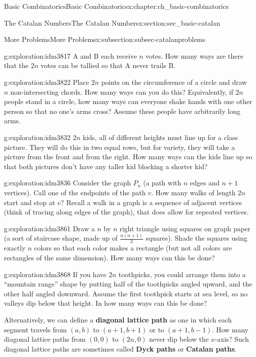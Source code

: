 \documentclass[oneside,10pt,]{book}
\newcommand{\terminology}[1]{\textbf{#1}}
\numberwithin{equation}{chapter}
\begin{document}
\begin{chapterptx}{Basic Combinatorics}{}{Basic Combinatorics}{}{}{x:chapter:ch_basic-combinatorics}
\begin{sectionptx}{The Catalan Numbers}{}{The Catalan Numbers}{}{}{x:section:sec_basic-catalan}
\begin{subsectionptx}{More Problems}{}{More Problems}{}{}{x:subsection:subsec-catalanproblems}
\begin{exploration}{}{g:exploration:idm3817}
A and B each receive \(n\) votes. How many ways are there that the \(2n\) votes can be tallied so that A never trails B.%
\end{exploration}
\begin{exploration}{}{g:exploration:idm3822}%
Place \(2n\) points on the circumference of a circle and draw \(n\)  non-intersecting chords.  How many ways can you do this?  Equivalently, if \(2n\) people stand in a circle, how many ways can everyone shake hands with one other person so that no one's arms cross?  Assume these people have arbitrarily long arms.%
\end{exploration}
\begin{exploration}{}{g:exploration:idm3832}%
\(2n\) kids, all of different heights must line up for a class picture.  They will do this in two equal rows, but for variety, they will take a picture from the front and from the right.  How many ways can the kids line up so that both pictures don't have any taller kid blocking a shorter kid?%
\end{exploration}
\begin{exploration}{}{g:exploration:idm3836}%
Consider the graph \(P_n\) (a path with \(n\) edges and \(n+1\) vertices).  Call one of the endpoints of the path \(v\).  How many walks of length \(2n\) start and stop at \(v\)?  Recall a walk in a graph is a sequence of adjacent vertices (think of tracing along edges of the graph), that does allow for repeated vertices.%
\end{exploration}
\begin{exploration}{}{g:exploration:idm3861}%
Draw a \(n\) by \(n\) right triangle using squares on graph paper (a sort of staircase shape, made up of \(\frac{n(n+1)}{2}\) squares).  Shade the squares using exactly \(n\) colors so that each color makes a rectangle (but not all colors are rectangles of the same dimension).  How many ways can this be done?%
\end{exploration}
\begin{exploration}{}{g:exploration:idm3868}%
If you have \(2n\) toothpicks, you could arrange them into a ``mountain range'' shape by putting half of the toothpicks angled upward, and the other half angled downward.  Assume the first toothpick starts at sea level, so no valleys dip below that height. In how many ways can this be done?%
\par
Alternatively, we can define a \terminology{diagonal lattice path} as one in which each segment travels from \((a,b)\) to \((a+1, b+1)\) or to \((a+1, b-1)\).  How many diagonal lattice paths from \((0,0)\) to \((2n,0)\) never dip below the \(x\)-axis?  Such diagonal lattice paths are sometimes called \terminology{Dyck paths} or \terminology{Catalan paths}.%

\end{exploration}
\end{subsectionptx}
\end{sectionptx}
\end{chapterptx}
\end{document}
